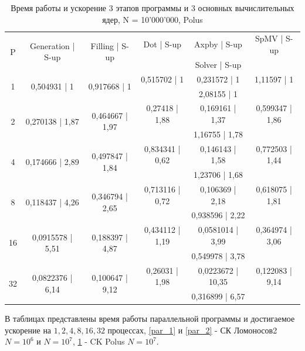 		\begin{table}[H]
			\begin{tabular}{|c||c|c|c|c|c|}
				\hline
\multirow{2}{*}{P} &  \multirow{2}{*}{Generation | S-up} & \multirow{2}{*}{Filling | S-up} & Dot | S-up & Axpby | S-up & SpMV | S-up \\ \cline{4-6}
                   &                              &                         & \multicolumn{3}{c|}{Solver | S-up} \\ \hline
\multirow{2}{*}{1} & \multirow{2}{*}{0,504931 | 1} & \multirow{2}{*}{0,917668 | 1} & 0,515702 | 1 & 0,231572 | 1 & 1,11597 | 1\\ \cline{4-6}
                   &                   &                   & \multicolumn{3}{c|}{2,08155 | 1}   \\ \hline
\multirow{2}{*}{2} & \multirow{2}{*}{0,270138 | 1,87} & \multirow{2}{*}{0,464667 | 1,97} & 0,27418 | 1,88 & 0,169161 | 1,37& 0,599347 | 1,86 \\ \cline{4-6}
                   &                   &                   & \multicolumn{3}{c|}{1,16755 | 1,78}   \\ \hline
\multirow{2}{*}{4} & \multirow{2}{*}{0,174666 | 2,89} & \multirow{2}{*}{0,497847 | 1,84} &0,834341 | 0,62 & 0,146143 | 1,58& 0,772503 | 1,44 \\ \cline{4-6}
                   &                   &                   & \multicolumn{3}{c|}{1,23706 | 1,68}   \\ \hline
\multirow{2}{*}{8} & \multirow{2}{*}{0,118437 | 4,26} & \multirow{2}{*}{0,346794 | 2,65} &0,713116 | 0,72 & 0,106369 | 2,18& 0,618075 | 1,81\\ \cline{4-6}
                   &                   &                   & \multicolumn{3}{c|}{0,938596 | 2,22}   \\ \hline
\multirow{2}{*}{16} & \multirow{2}{*}{0,0915578 | 5,51} & \multirow{2}{*}{0,188397 | 4,87} &0,434112 | 1,19 & 0,0581014 | 3,99& 0,364974 | 3,06\\ \cline{4-6}
                   &                   &                   & \multicolumn{3}{c|}{0,549978 | 3,78}   \\ \hline
\multirow{2}{*}{32} & \multirow{2}{*}{0,0822376 | 6,14} & \multirow{2}{*}{0,100647 | 9,12} & 0,26031 | 1,98& 0,0223672 | 10,35& 0,122083 | 9,14\\ \cline{4-6}
                   &                   &                   & \multicolumn{3}{c|}{0,316899 | 6,57}   \\ \hline
			\end{tabular}
			\caption{Время работы и ускорение 3 этапов программы и 3 основных вычислительных ядер, N = 10'000'000, Polus}
			\label{par_3}
		\end{table}
		В таблицах представлены время работы параллельной программы и достигаемое ускорение на \(1, 2, 4, 8, 16, 32\) процессах,  \ref{par_1} и \ref{par_2} - СК Ломоносов2 \(N = 10^6\) и \(N = 10^7\), \ref{par_3} - CK Polus \(N = 10^7\).

